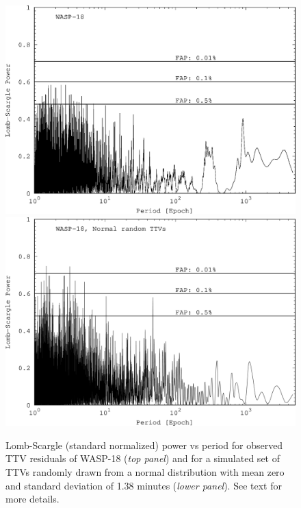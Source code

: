 \begin{figure}
\centering
\includegraphics[width=0.7\columnwidth]{imagenes/LS_WASP18_New_GIMP.png}
\includegraphics[width=0.7\columnwidth]{imagenes/LS_WASP18_NormRandom_New_GIMP.png}
\caption{Lomb-Scargle (standard normalized) power vs period for observed TTV residuals of WASP-18 (\emph{top panel}) and for a simulated set of TTVs randomly drawn from a normal distribution with mean zero and standard deviation of 1.38 minutes (\emph{lower panel}). See text for more details.}
\label{LS_wasp18_random}
\end{figure}

